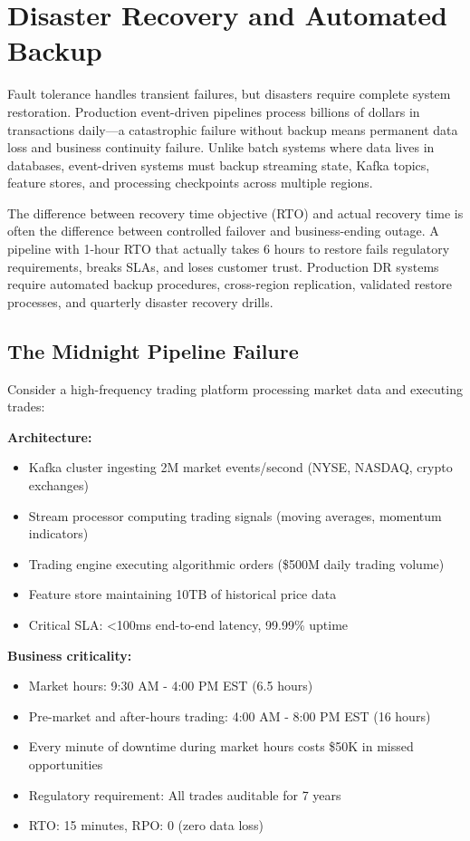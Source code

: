 \section{Disaster Recovery and Automated Backup}

Fault tolerance handles transient failures, but disasters require complete system restoration. Production event-driven pipelines process billions of dollars in transactions daily---a catastrophic failure without backup means permanent data loss and business continuity failure. Unlike batch systems where data lives in databases, event-driven systems must backup streaming state, Kafka topics, feature stores, and processing checkpoints across multiple regions.

The difference between recovery time objective (RTO) and actual recovery time is often the difference between controlled failover and business-ending outage. A pipeline with 1-hour RTO that actually takes 6 hours to restore fails regulatory requirements, breaks SLAs, and loses customer trust. Production DR systems require automated backup procedures, cross-region replication, validated restore processes, and quarterly disaster recovery drills.

\subsection{The Midnight Pipeline Failure}

Consider a high-frequency trading platform processing market data and executing trades:

\textbf{Architecture:}
\begin{itemize}
    \item Kafka cluster ingesting 2M market events/second (NYSE, NASDAQ, crypto exchanges)
    \item Stream processor computing trading signals (moving averages, momentum indicators)
    \item Trading engine executing algorithmic orders (\$500M daily trading volume)
    \item Feature store maintaining 10TB of historical price data
    \item Critical SLA: <100ms end-to-end latency, 99.99\% uptime
\end{itemize}

\textbf{Business criticality:}
\begin{itemize}
    \item Market hours: 9:30 AM - 4:00 PM EST (6.5 hours)
    \item Pre-market and after-hours trading: 4:00 AM - 8:00 PM EST (16 hours)
    \item Every minute of downtime during market hours costs \$50K in missed opportunities
    \item Regulatory requirement: All trades auditable for 7 years
    \item RTO: 15 minutes, RPO: 0 (zero data loss)
\end{itemize}

